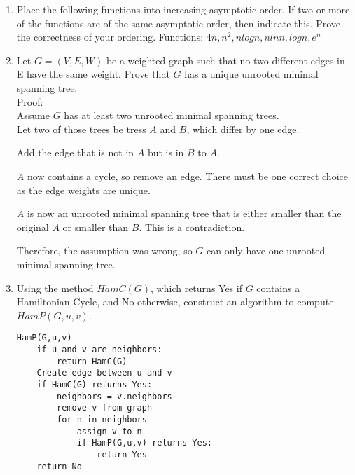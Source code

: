 \documentclass[12pt]{article}
\begin{document}
\begin{enumerate}
\begin{itemize}
\end{itemize}


\item Place the following functions into increasing asymptotic order. If two
or more of the functions are of the same asymptotic order, then indicate this.
Prove the correctness of your ordering.
Functions: $4n, n^2, nlogn, nlnn, logn, e^n$

\item Let $G = (V,E,W)$ be a weighted graph such that no two different edges
in E have the same weight. Prove that $G$ has a unique unrooted minimal spanning
tree.\\
Proof:\\
Assume $G$ has at least two unrooted minimal spanning trees.\\
Let two of those trees be tress $A$ and $B$, which differ by one
edge.

Add the edge that is not in $A$ but is in $B$ to $A$.

$A$ now contains a cycle, so remove an edge. There must be one
correct choice as the edge weights are unique.

$A$ is now an unrooted minimal spanning tree that is either
smaller than the original $A$ or smaller than $B$. This is a contradiction.

Therefore, the assumption was wrong, so $G$ can only have one
unrooted minimal spanning tree.


\item Using the method $HamC(G)$, which returns Yes if $G$ contains a
Hamiltonian Cycle, and No otherwise, construct an algorithm to compute
$HamP(G,u,v)$.

\begin{lstlisting}
HamP(G,u,v)
    if u and v are neighbors:
        return HamC(G)
    Create edge between u and v
    if HamC(G) returns Yes:
        neighbors = v.neighbors
        remove v from graph
        for n in neighbors
            assign v to n
            if HamP(G,u,v) returns Yes:
                return Yes
    return No

\end{lstlisting}

\end{enumerate}
\end{document}
